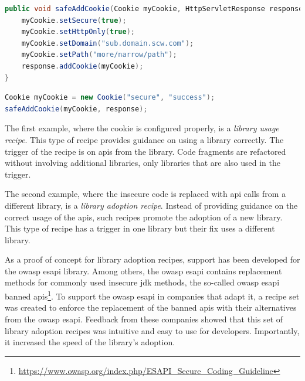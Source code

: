 \begin{lstlisting}[language={Java},caption={A wrapper library can be created to avoid code reuse and to improve clarity of the guidelines for the developer.}, float,label={lst:cookie3},abovecaptionskip=-0.0pt] 
public void safeAddCookie(Cookie myCookie, HttpServletResponse response){
    myCookie.setSecure(true);
    myCookie.setHttpOnly(true);
    myCookie.setDomain("sub.domain.scw.com");
    myCookie.setPath("more/narrow/path");
    response.addCookie(myCookie);
}
\end{lstlisting}

\begin{lstlisting}[language={Java},caption={Migrating to the wrapper library consists of replacing the original methodcall with one from the library.},float,label={lst:cookie4},abovecaptionskip=-0.0pt]
Cookie myCookie = new Cookie("secure", "success");
safeAddCookie(myCookie, response);
\end{lstlisting}

The first example, where the cookie is configured properly, is a \emph{library usage recipe}.
This type of recipe provides guidance on using a library correctly.
The trigger of the recipe is on \glspl{api} from the library.
Code fragments are refactored without involving additional libraries, only libraries that are also used in the trigger.

The second example, where the insecure code is replaced with \gls{api} calls from a different library, is a \emph{library adoption recipe}.
Instead of providing guidance on the correct usage of the \glspl{api}, such recipes promote the adoption of a new library.
This type of recipe has a trigger in one library but their fix uses a different library.

As a proof of concept for library adoption recipes, support has been developed for the \gls{owasp} \gls{esapi} library.
Among others, the \gls{owasp} \gls{esapi} contains replacement methods for commonly used insecure \gls{jdk} methods, the so-called \gls{owasp} \gls{esapi} banned \glspl{api}\footnote{\url{https://www.owasp.org/index.php/ESAPI\_Secure\_Coding\_Guideline}}.
To support the \gls{owasp} \gls{esapi} in companies that adapt it, a recipe set was created to enforce the replacement of the banned \glspl{api} with their alternatives from the \gls{owasp} \gls{esapi}.
Feedback from these companies showed that this set of library adoption recipes was intuitive and easy to use for developers.
Importantly, it increased the speed of the library's adoption.

